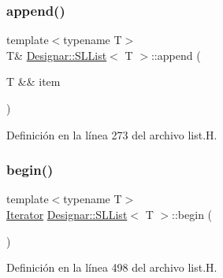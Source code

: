 \mbox{\label{class_designar_1_1_s_l_list_a2eba31f3a7629a3d96bc87f720f79918}} 
\subsubsection{\texorpdfstring{append()}{append()}\hspace{0.1cm}{\footnotesize\ttfamily [2/2]}}
{\footnotesize\ttfamily template$<$typename T$>$ \\
T\& \hyperlink{class_designar_1_1_s_l_list}{Designar\+::\+S\+L\+List}$<$ T $>$\+::append (\begin{DoxyParamCaption}\item[{T \&\&}]{item }\end{DoxyParamCaption})\hspace{0.3cm}{\ttfamily [inline]}}



Definición en la línea 273 del archivo list.\+H.

\mbox{\label{class_designar_1_1_s_l_list_aaff598b2f723981c65c5b17830537994}} 
\subsubsection{\texorpdfstring{begin()}{begin()}\hspace{0.1cm}{\footnotesize\ttfamily [1/2]}}
{\footnotesize\ttfamily template$<$typename T$>$ \\
\hyperlink{class_designar_1_1_s_l_list_1_1_iterator}{Iterator} \hyperlink{class_designar_1_1_s_l_list}{Designar\+::\+S\+L\+List}$<$ T $>$\+::begin (\begin{DoxyParamCaption}{ }\end{DoxyParamCaption})\hspace{0.3cm}{\ttfamily [inline]}}



Definición en la línea 498 del archivo list.\+H.

\mbox{\label{class_designar_1_1_s_l_list_ada42ce0576fda045f39e09d7a6846586}} 
